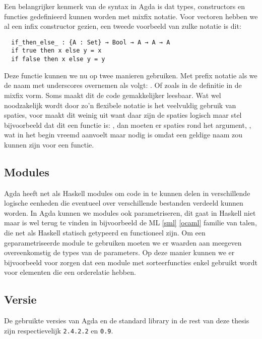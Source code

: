 Een belangrijker kenmerk van de syntax in Agda is dat types, constructors en
functies gedefinieerd kunnen worden met mixfix notatie. Voor vectoren hebben we
al een infix constructor gezien, een tweede voorbeeld van zulke notatie is dit:

\begin{verbatim}
  if_then_else_ : {A : Set} → Bool → A → A → A
  if true then x else y = x
  if false then x else y = y
\end{verbatim}

Deze functie kunnen we nu op twee manieren gebruiken. Met prefix notatie als we
de naam met underscores overnemen als volgt: . Of
zoals in de definitie in de mixfix vorm. Soms maakt dit de code gemakkelijker
leesbaar. Wat wel noodzakelijk wordt door zo'n flexibele notatie is het
veelvuldig gebruik van spaties, voor  maakt dit weinig uit
want daar zijn de spaties logisch maar stel bijvoorbeeld dat dit een functie
is: \iagda{[_]}, dan moeten er spaties rond het argument, \iagda{[ x ]}, wat in
het begin vreemd aanvoelt maar nodig is omdat \iagda{[x]} een geldige naam zou
kunnen zijn voor een functie.

\subsection{Modules}

Agda heeft net als Haskell modules om code in te kunnen delen in verschillende
logische eenheden die eventueel over verschillende bestanden verdeeld kunnen
worden. In Agda kunnen we modules ook parametriseren, dit gaat in Haskell niet
maar is wel terug te vinden in bijvoorbeeld de ML \ref{sml} \ref{ocaml} familie
van talen, die net als Haskell statisch getypeerd en functioneel zijn. Om een
geparametriseerde module te gebruiken moeten we er waarden aan meegeven
overeenkomstig de types van de parameters. Op deze manier kunnen we er
bijvoorbeeld voor zorgen dat een module met sorteerfuncties enkel gebruikt
wordt voor elementen die een orderelatie hebben.

\subsection{Versie}

De gebruikte versies van Agda en de standard library in de rest van deze thesis
zijn respectievelijk \texttt{2.4.2.2} en \texttt{0.9}.


